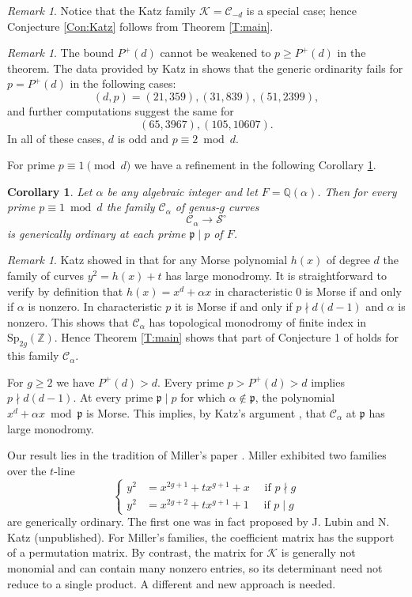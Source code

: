 \documentclass{amsart}
\theoremstyle{plain}
\newtheorem{corollary}[theorem]{Corollary}
\theoremstyle{remark}
\newtheorem{remark}[theorem]{Remark}
\theoremstyle{remark}
\newcommand{\fp}{\mathfrak{p}}
\newcommand{\cS}{\mathcal{S}}
\newcommand{\cK}{\mathcal{K}}
\newcommand{\cC}{\mathcal{C}}
\newcommand{\Sp}{\mathrm{Sp}}
\newcommand{\0}{\mathbf{0}}
\newcommand{\1}{\mathbf{1}}
\newcommand{\Q}{\mathbb{Q}}
\newcommand{\Z}{\mathbb{Z}}
\begin{document}
\begin{remark}
Notice that the Katz family $\cK=\cC_{-d}$ is a special case;
hence Conjecture \ref{Con:Katz} follows from Theorem \ref{T:main}.
\end{remark}


\begin{remark}
The bound $P^+(d)$ cannot be weakened to $p\ge P^+(d)$ in the theorem.
The data provided by Katz in \cite{Kat18}
shows that the generic ordinarity fails for $p=P^+(d)$ 
in the following cases:
$$(d,p)=(21,359), (31,839), (51,2399),$$
and further computations suggest the same for 
$$(65,3967),(105, 10607).$$
In all of these cases, $d$ is odd and $p\equiv 2\bmod d$. 
\end{remark}

For prime $p\equiv 1\pmod d$ we have
a refinement in the following Corollary \ref{C:bound}.

\begin{corollary}\label{C:bound}
Let $\alpha$ be any algebraic integer and let $F=\Q(\alpha)$.
Then for every prime $p\equiv 1\bmod d$ 
the family $\cC_\alpha$ of genus-$g$ curves 
$$\cC_\alpha \longrightarrow \cS^\circ$$
is generically ordinary at each prime $\fp\mid p$ of $F$.
\end{corollary}

\begin{remark}
Katz showed in \cite{Kat14} 
that for any Morse polynomial $h(x)$ of degree $d$ 
the family of curves $y^2=h(x)+t$ has large monodromy. 
It is straightforward to verify by definition 
that $h(x)=x^d+\alpha x$ 
in characteristic $0$ is Morse if and only if $\alpha$ is nonzero.
In characteristic $p$ it is Morse if and only if  $p\nmid d(d-1)$ and  
$\alpha$ is nonzero. 
This shows that $\cC_\alpha$ has topological monodromy of finite index in $\Sp_{2g}(\Z)$. Hence Theorem \ref{T:main} shows that
part of Conjecture 1 of \cite{Kat18} holds for this family 
$\cC_\alpha$.
\end{remark}




For $g\ge2$ we have $P^+(d)> d$. Every 
prime $p>P^+(d)>d$ implies $p\nmid d(d-1)$.
At every prime $\fp\mid p$ for which $\alpha\not\in \fp$, 
the polynomial 
$x^d+\alpha x\bmod \fp$ is Morse. 
This implies, by Katz's argument \cite{Kat14}, that 
$\cC_\alpha$ at $\fp$ has large monodromy. 



\vspace{5mm}

Our result lies in the tradition of Miller's paper \cite{Mil72}. 
Miller exhibited two families over the $t$-line 
$$
\begin{cases}
        y^2&=x^{2g+1}+t x^{g+1}+x \quad\mbox{ if $p\nmid g$}\\
y^2&=x^{2g+2}+t x^{g+1}+1 \quad \mbox{ if $p\mid g$}
\end{cases}
$$
are generically ordinary. 
The first one was in fact proposed by 
J. Lubin and N. Katz (unpublished). 
For Miller's families, the coefficient matrix has the support of a permutation
matrix. By contrast, the matrix for $\cK$
is generally not monomial and 
can contain many nonzero entries, so its determinant need not reduce to a single product. 
A different and new approach is needed. 
\end{document}
